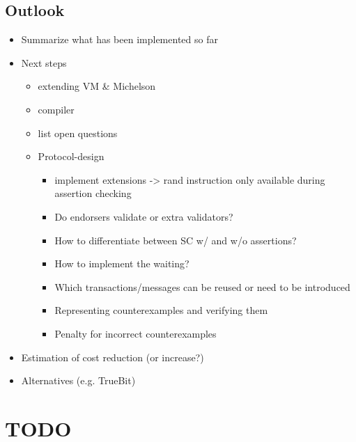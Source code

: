 
\subsection{Outlook}

\draft{}
\begin{itemize}
\item Summarize what has been implemented so far
\item Next steps
	\begin{itemize}
	\item extending VM \& Michelson
	\item compiler
	\item list open questions
	\item Protocol-design
		\begin{itemize}
		\item implement extensions -> rand instruction only available during assertion checking
		\item Do endorsers validate or extra validators?
		\item How to differentiate between SC w/ and w/o assertions?
		\item How to implement the waiting?
		\item Which transactions/messages can be reused or need to be introduced
		\item Representing counterexamples and verifying them
		\item Penalty for incorrect counterexamples
		\end{itemize}
	\end{itemize}
\item Estimation of cost reduction (or increase?)
\item Alternatives (e.g. TrueBit)
\end{itemize}


\section{TODO}
